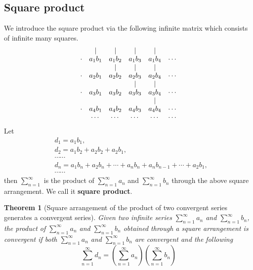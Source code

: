 \documentclass{article}
\newtheorem{thm}{Theorem}[section]
\theoremstyle{remark}
\newcommand\tikznode[2]{\tikz[remember picture,baseline=(#1.base)]{\node(#1)[inner sep=0pt]{#2};}}
\begin{document}
\subsection{Square product}
We introduce the square product via the following infinite matrix which consists of infinite many squares.
\[
\begin{matrix}
 & | & | & | & | & \\
\tikznode{r2c1}{$\cdot$} &\tikznode{r2c2}{$a_1b_1$}  & a_1b_2 & a_1b_3 & a_1b_4 & \cdots\\
 & & | & | & | & \\
\tikznode{r4c1}{$\cdot$} & \tikznode{r4c2}{$a_2b_1$} & \tikznode{r4c3}{$a_2b_2$} & a_2b_3 & a_2b_4 & \cdots\\
 & &  & | & | & \\
\tikznode{r6c1}{$\cdot$} & \tikznode{r6c2}{$a_3b_1$} & \tikznode{r6c3}{$a_3b_2$} & \tikznode{r6c4}{$a_3b_3$} & a_3b_4 & \cdots\\
 & &  &  & | & \\
\tikznode{r8c1}{$\cdot$} &\tikznode{r8c2}{$a_4b_1$}&\tikznode{r8c3}{$a_4b_2$}&\tikznode{r8c4}{$a_4b_3$}&\tikznode{r8c5}{$a_4b_4$}& \cdots\\
 & \cdots & \cdots & \cdots & \cdots & \cdots
\end{matrix}
\]
Let 
\begin{align*}
 &d_1=a_1b_1, \\
 &d_2=a_1b_2+a_2b_2+a_2b_1,\\
 &\cdots\cdots\\
 &d_n=a_1b_n+a_2b_n+\cdots+a_nb_n+a_nb_{n-1}+\cdots+a_2b_1,\\
 &\cdots\cdots
\end{align*}
then $\sum_{n=1}^{\infty}$ is the product of $\sum_{n=1}^{\infty}a_n$ and $\sum_{n=1}^{\infty}b_n$ through the above square arrangement. We call it \textbf{square product}.
\begin{thm}[Square arrangement of the product of two convergent series generates a convergent series]
Given two infinite series $\sum_{n=1}^{\infty}a_n$ and $\sum_{n=1}^{\infty}b_n$, the product of $\sum_{n=1}^{\infty}a_n$ and $\sum_{n=1}^{\infty}b_n$ obtained through a square arrangement is convergent if both $\sum_{n=1}^{\infty}a_n$ and $\sum_{n=1}^{\infty}b_n$ are convergent and the following
\[
\sum_{n=1}^{\infty}d_n=\left(\sum_{n=1}^{\infty}a_n\right)\left(\sum_{n=1}^{\infty}b_n\right)
\]
\end{thm}
\end{document}
